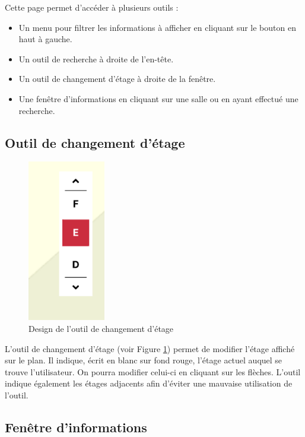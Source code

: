 \documentclass[
    iai, %
    il, %
]{heig-tb}
\begin{document}
Cette page permet d'accéder à plusieurs outils :

\begin{itemize}
    \item Un menu pour filtrer les informations à afficher en cliquant sur le bouton en haut à gauche.
    \item Un outil de recherche à droite de l'en-tête.
    \item Un outil de changement d'étage à droite de la fenêtre.
    \item Une fenêtre d'informations en cliquant sur une salle ou en ayant effectué une recherche.
\end{itemize}

\subsection{Outil de changement d'étage}

\begin{figure}[h]
    \centering
    \includegraphics[scale=1]{designChangementEtage.png}
    \caption{Design de l'outil de changement d'étage}
    \label{fig:floorChange}
\end{figure}

L'outil de changement d'étage (voir Figure \ref{fig:floorChange}) permet de modifier l'étage affiché sur le plan.
Il indique, écrit en blanc sur fond rouge, l'étage actuel auquel se trouve l'utilisateur.
On pourra modifier celui-ci en cliquant sur les flèches.
L'outil indique également les étages adjacents
afin d'éviter une mauvaise utilisation de l'outil.

\subsection{Fenêtre d'informations}
\end{document}
